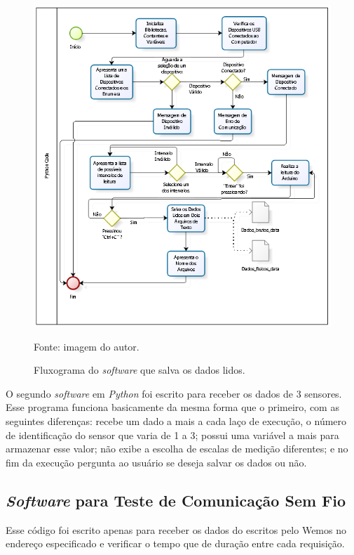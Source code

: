 		\begin{figure}[h]
			\centering
			\includegraphics[keepaspectratio=true,scale=1]{figuras/diagrama_python.PNG}
			\caption{Fluxograma do \textit{software} que salva os dados lidos. }
			Fonte: imagem do autor. 
			\label{fluxograma_python}	
		\end{figure}
		
		O segundo \textit{software} em \textit{Python} foi escrito para receber os dados de 3 sensores. Esse programa funciona basicamente da mesma forma que o primeiro, com as seguintes  diferenças:  recebe um dado a mais a cada laço de execução, o número de identificação do sensor que varia de 1 a 3; possui uma variável a mais para  armazenar esse valor; não exibe a escolha de escalas de medição diferentes; e no fim da execução pergunta ao usuário se deseja salvar os dados ou não.

\subsection{\textit{Software} para Teste de Comunicação Sem Fio}

	Esse código foi escrito apenas para receber os dados do escritos pelo Wemos no endereço especificado e verificar o tempo que de duração entre cada requisição.
	
